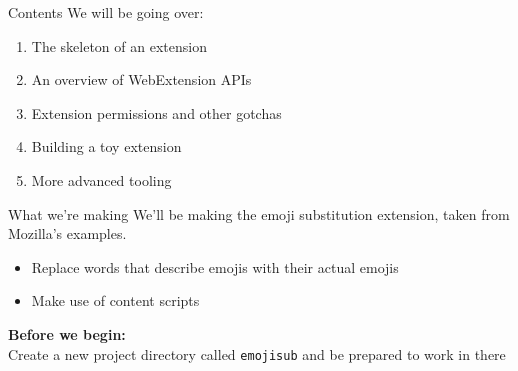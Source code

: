 \documentclass[../index.tex]{subfiles}
\begin{document}

\renewcommand{\currenttitle}{Contents}
\begin{frame}{\currenttitle}
  We will be going over:
  \begin{enumerate}
    \item The skeleton of an extension
    \item An overview of WebExtension APIs
    \item Extension permissions and other gotchas
    \item Building a toy extension
    \item More advanced tooling
  \end{enumerate}
\end{frame}

\renewcommand{\currenttitle}{What we're making}
\begin{frame}[fragile]{\currenttitle}
  We'll be making the emoji substitution extension, taken from Mozilla's
  examples\footnotemark{}.

  \begin{itemize}
    \item Replace words that describe emojis with their actual emojis
    \item Make use of content scripts
  \end{itemize}

  \vspace*{2em}

  \textbf{Before we begin:} \\
  Create a new project directory called \texttt{emojisub} and be prepared to
  work in there


\end{frame}

\end{document}
